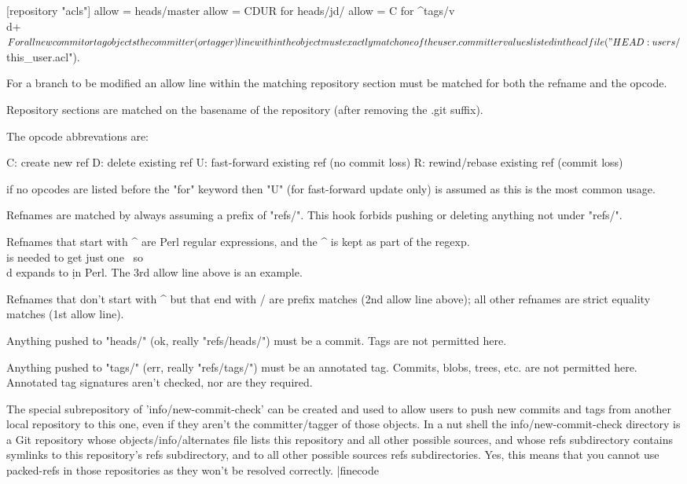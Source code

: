   [repository "acls"]
    allow = heads/master
    allow = CDUR for heads/jd/
    allow = C    for ^tags/v\\d+$

For all new commit or tag objects the committer (or tagger) line
within the object must exactly match one of the user.committer
values listed in the acl file ("HEAD:users/$this_user.acl").

For a branch to be modified an allow line within the matching
repository section must be matched for both the refname and the
opcode.

Repository sections are matched on the basename of the repository
(after removing the .git suffix).

The opcode abbrevations are:

  C: create new ref
  D: delete existing ref
  U: fast-forward existing ref (no commit loss)
  R: rewind/rebase existing ref (commit loss)

if no opcodes are listed before the "for" keyword then "U" (for
fast-forward update only) is assumed as this is the most common
usage.

Refnames are matched by always assuming a prefix of "refs/".
This hook forbids pushing or deleting anything not under "refs/".


Refnames that start with ^ are Perl regular expressions, and the ^
is kept as part of the regexp.  \\ is needed to get just one \, so
\\d expands to \d in Perl.  The 3rd allow line above is an example.

Refnames that don't start with ^ but that end with / are prefix
matches (2nd allow line above); all other refnames are strict
equality matches (1st allow line).

Anything pushed to "heads/" (ok, really "refs/heads/") must be
a commit.  Tags are not permitted here.

Anything pushed to "tags/" (err, really "refs/tags/") must be an
annotated tag.  Commits, blobs, trees, etc. are not permitted here.
Annotated tag signatures aren't checked, nor are they required.

The special subrepository of 'info/new-commit-check' can
be created and used to allow users to push new commits and
tags from another local repository to this one, even if they
aren't the committer/tagger of those objects.  In a nut shell
the info/new-commit-check directory is a Git repository whose
objects/info/alternates file lists this repository and all other
possible sources, and whose refs subdirectory contains symlinks
to this repository's refs subdirectory, and to all other possible
sources refs subdirectories.  Yes, this means that you cannot
use packed-refs in those repositories as they won't be resolved
correctly.
|finecode


